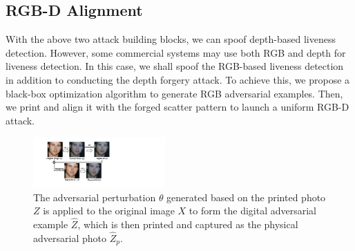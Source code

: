 \subsection{RGB-D Alignment}
With the above two attack building blocks, we can spoof depth-based liveness detection. However, some commercial systems may use both RGB and depth for liveness detection. In this case, we shall spoof the RGB-based liveness detection in addition to conducting the depth forgery attack. To achieve this, we propose a black-box optimization algorithm to generate  RGB adversarial examples. Then, we print  and  align it with the forged scatter pattern to launch a uniform RGB-D attack. 

\begin{figure}[!t]
	\centering
	\includegraphics[width=0.45\textwidth]{figures/adv_mapping.pdf} 
	\vspace{-0.1in}
	\caption{The adversarial perturbation $\theta$ generated based on the printed photo $Z$ is applied to the original image $X$ to form the digital adversarial example $\widehat{Z}$, which is then printed and captured as the physical adversarial photo $\widehat{Z}_p$.}
	\label{rgb_mapping}
	\vspace{-0.15in}
\end{figure}

